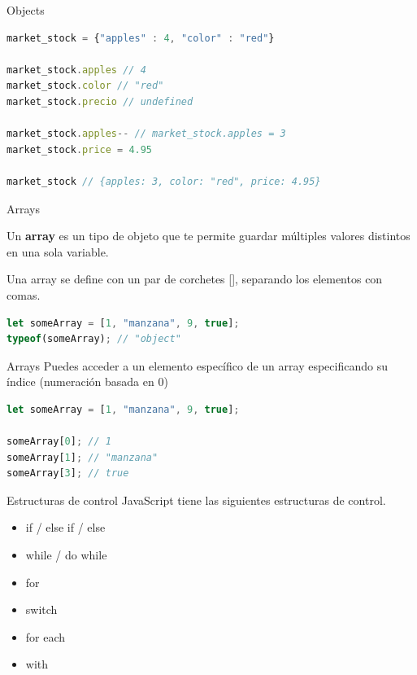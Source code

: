 \documentclass{beamer}
\begin{document}
\begin{frame}[fragile]{Objects}
\begin{lstlisting}[language=JavaScript]
market_stock = {"apples" : 4, "color" : "red"}

market_stock.apples // 4
market_stock.color // "red"
market_stock.precio // undefined

market_stock.apples-- // market_stock.apples = 3
market_stock.price = 4.95

market_stock // {apples: 3, color: "red", price: 4.95}
\end{lstlisting}
\end{frame}

\begin{frame}[fragile]{Arrays}

Un \textbf{array} es un tipo de objeto que te permite guardar múltiples valores distintos en una sola variable.

Una array se define con un par de corchetes [], separando los elementos con comas.

\begin{lstlisting}[language=JavaScript]
let someArray = [1, "manzana", 9, true];
typeof(someArray); // "object"
\end{lstlisting}


\end{frame}

\begin{frame}[fragile]{Arrays}
Puedes acceder a un elemento específico de un array especificando su índice (numeración basada en 0)

\begin{lstlisting}[language=JavaScript]
let someArray = [1, "manzana", 9, true];

someArray[0]; // 1
someArray[1]; // "manzana"
someArray[3]; // true
\end{lstlisting} 
\end{frame}


\begin{frame}{Estructuras de control}
JavaScript tiene las siguientes estructuras de control.
\begin{itemize}
    \item if / else if / else
    \item while / do while
    \item for
    \item switch
    \item for each
    \item with
\end{itemize}
\end{frame}
\end{document}

